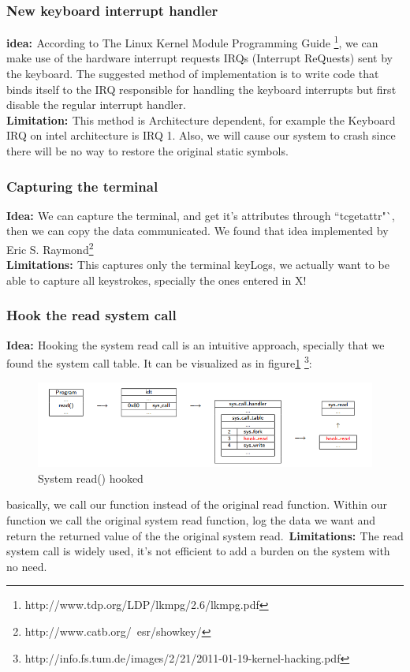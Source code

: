 \documentclass{article}
\begin{document}
\subsubsection{New keyboard interrupt handler}
{\bf{idea: }}According to The Linux Kernel Module Programming Guide \footnote{http://www.tdp.org/LDP/lkmpg/2.6/lkmpg.pdf}, we can make use of the hardware interrupt requests IRQs (Interrupt ReQuests) sent by the keyboard. The suggested method of implementation is to write code that binds itself to the IRQ responsible for handling the keyboard interrupts but first disable the regular interrupt handler.\\
{\bf{Limitation: }} This method is Architecture dependent, for example the Keyboard IRQ on intel architecture is IRQ 1.
Also, we will cause our system to crash since there will be no way to restore the original static symbols.
\subsubsection{Capturing the terminal}
{\bf{Idea: }}We can capture the terminal, and get it's attributes through ``tcgetattr"`, then we can copy the data communicated. We found that idea implemented by Eric S. Raymond\footnote{http://www.catb.org/~esr/showkey/}\\
{\bf{Limitations: }}This captures only the terminal keyLogs, we actually want to be able to capture all keystrokes, specially the ones entered in X!
\clearpage
\subsubsection{Hook the read system call}
{\bf{Idea: }}Hooking the system read call is an intuitive approach, specially that we found the system call table.
It can be visualized as in figure\ref{fig:hookRead} \footnote{http://info.fs.tum.de/images/2/21/2011-01-19-kernel-hacking.pdf}:\\
\begin{figure}[h!]
    \centering
    \includegraphics[width=\linewidth]{hook}
    \caption{System read() hooked}
    \label{fig:hookRead}
\end{figure}
basically, we call our function instead of the original read function. Within our function we call the original system read function, log the data we want and return the returned value of the the original system read.\
{\bf{Limitations: }} The read system call is widely used, it's not efficient to add a burden on the system with no need.
\end{document}
